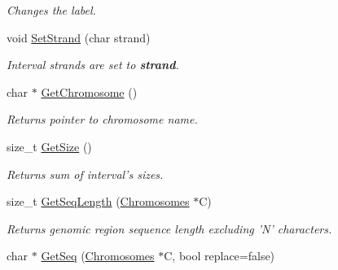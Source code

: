 \begin{DoxyCompactItemize}
\begin{DoxyCompactList}\small\item\em Changes the label. \end{DoxyCompactList}\item 
\hypertarget{classGenomicRegion_ae795532404bad8b93bec632c20d12b9d}{
void \hyperlink{classGenomicRegion_ae795532404bad8b93bec632c20d12b9d}{SetStrand} (char strand)}
\label{classGenomicRegion_ae795532404bad8b93bec632c20d12b9d}

\begin{DoxyCompactList}\small\item\em Interval strands are set to {\bfseries strand}. \end{DoxyCompactList}\item 
\hypertarget{classGenomicRegion_a815baa00d7d33f179181560a1fe468fc}{
char $\ast$ \hyperlink{classGenomicRegion_a815baa00d7d33f179181560a1fe468fc}{GetChromosome} ()}
\label{classGenomicRegion_a815baa00d7d33f179181560a1fe468fc}

\begin{DoxyCompactList}\small\item\em Returns pointer to chromosome name. \end{DoxyCompactList}\item 
\hypertarget{classGenomicRegion_a5bff7a3e83b0bc9bfb5441270d0ba1ae}{
size\_\-t \hyperlink{classGenomicRegion_a5bff7a3e83b0bc9bfb5441270d0ba1ae}{GetSize} ()}
\label{classGenomicRegion_a5bff7a3e83b0bc9bfb5441270d0ba1ae}

\begin{DoxyCompactList}\small\item\em Returns sum of interval's sizes. \end{DoxyCompactList}\item 
\hypertarget{classGenomicRegion_a719143f1affa44c38493b2cd43448d3b}{
size\_\-t \hyperlink{classGenomicRegion_a719143f1affa44c38493b2cd43448d3b}{GetSeqLength} (\hyperlink{classChromosomes}{Chromosomes} $\ast$C)}
\label{classGenomicRegion_a719143f1affa44c38493b2cd43448d3b}

\begin{DoxyCompactList}\small\item\em Returns genomic region sequence length excluding 'N' characters. \end{DoxyCompactList}\item 
\hypertarget{classGenomicRegion_afcf7c053989b87f425f084d1f2c078f5}{
char $\ast$ \hyperlink{classGenomicRegion_afcf7c053989b87f425f084d1f2c078f5}{GetSeq} (\hyperlink{classChromosomes}{Chromosomes} $\ast$C, bool replace=false)}
\label{classGenomicRegion_afcf7c053989b87f425f084d1f2c078f5}


\end{DoxyCompactItemize}
